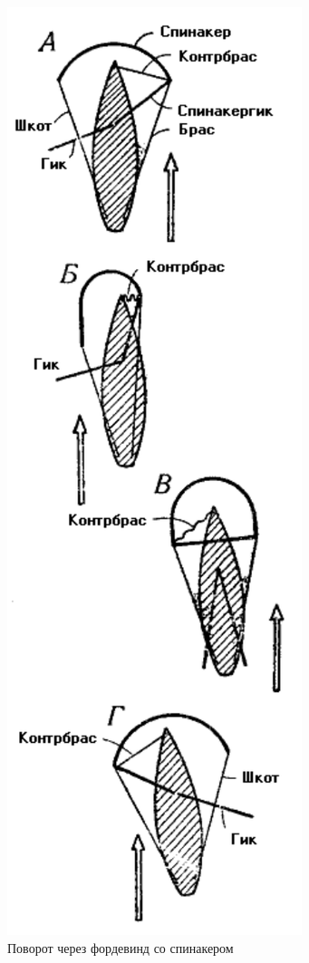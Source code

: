 \documentclass[a4paper, 12pt, twoside, final]{scrbook}
\begin{document}
\begin{figure}
	\centering
	\includegraphics[scale=1]{115_Povorot_fordevind_spinaker}
	\caption{Поворот через фордевинд со спинакером}
	\label{fig:115}
\end{figure}
\end{document}
